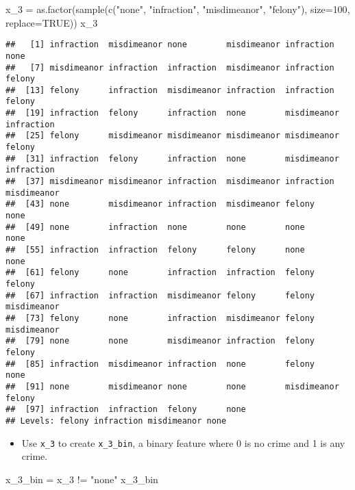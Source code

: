 \documentclass[
]{article}
\newenvironment{Shaded}{\begin{snugshade}}{\end{snugshade}}
\newcommand{\AttributeTok}[1]{\textcolor[rgb]{0.77,0.63,0.00}{#1}}
\newcommand{\ConstantTok}[1]{\textcolor[rgb]{0.00,0.00,0.00}{#1}}
\newcommand{\DecValTok}[1]{\textcolor[rgb]{0.00,0.00,0.81}{#1}}
\newcommand{\FunctionTok}[1]{\textcolor[rgb]{0.00,0.00,0.00}{#1}}
\newcommand{\NormalTok}[1]{#1}
\newcommand{\OtherTok}[1]{\textcolor[rgb]{0.56,0.35,0.01}{#1}}
\newcommand{\SpecialCharTok}[1]{\textcolor[rgb]{0.00,0.00,0.00}{#1}}
\newcommand{\StringTok}[1]{\textcolor[rgb]{0.31,0.60,0.02}{#1}}
\providecommand{\tightlist}{%
  \setlength{\itemsep}{0pt}\setlength{\parskip}{0pt}}
\begin{document}
\begin{Shaded}
\begin{Highlighting}[]
\NormalTok{x\_3 }\OtherTok{=} \FunctionTok{as.factor}\NormalTok{(}\FunctionTok{sample}\NormalTok{(}\FunctionTok{c}\NormalTok{(}\StringTok{"none"}\NormalTok{,  }\StringTok{"infraction"}\NormalTok{, }\StringTok{"misdimeanor"}\NormalTok{, }\StringTok{"felony"}\NormalTok{), }\AttributeTok{size=}\DecValTok{100}\NormalTok{, }\AttributeTok{replace=}\ConstantTok{TRUE}\NormalTok{))}
\NormalTok{x\_3}
\end{Highlighting}
\end{Shaded}

\begin{verbatim}
##   [1] infraction  misdimeanor none        misdimeanor infraction  none       
##   [7] misdimeanor infraction  infraction  misdimeanor infraction  felony     
##  [13] felony      infraction  misdimeanor infraction  infraction  felony     
##  [19] infraction  felony      infraction  none        misdimeanor infraction 
##  [25] felony      misdimeanor misdimeanor misdimeanor misdimeanor felony     
##  [31] infraction  felony      infraction  none        misdimeanor infraction 
##  [37] misdimeanor misdimeanor infraction  misdimeanor infraction  misdimeanor
##  [43] none        misdimeanor infraction  misdimeanor felony      none       
##  [49] none        infraction  none        none        none        none       
##  [55] infraction  infraction  felony      felony      none        none       
##  [61] felony      none        infraction  infraction  felony      felony     
##  [67] infraction  infraction  misdimeanor felony      felony      misdimeanor
##  [73] felony      none        infraction  misdimeanor felony      misdimeanor
##  [79] none        none        misdimeanor infraction  felony      felony     
##  [85] infraction  misdimeanor infraction  none        felony      none       
##  [91] none        misdimeanor none        none        misdimeanor felony     
##  [97] infraction  infraction  felony      none       
## Levels: felony infraction misdimeanor none
\end{verbatim}

\begin{itemize}
\tightlist
\item
  Use \texttt{x\_3} to create \texttt{x\_3\_bin}, a binary feature where
  0 is no crime and 1 is any crime.
\end{itemize}

\begin{Shaded}
\begin{Highlighting}[]
\NormalTok{x\_3\_bin }\OtherTok{=}\NormalTok{ x\_3 }\SpecialCharTok{!=} \StringTok{"none"}
\NormalTok{x\_3\_bin}
\end{Highlighting}
\end{Shaded}
\end{document}
